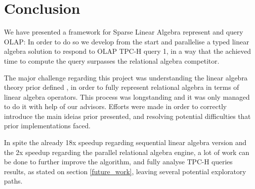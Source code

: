 \section{Conclusion}
\indent
\label{conclusion}


We have presented a framework for Sparse Linear Algebra represent and query OLAP: In order to do so we develop from the start and parallelise a typed linear algebra solution to respond to OLAP TPC-H query 1,  in a way that the achieved time to compute the query surpasses the relational algebra competitor.\par 

The major challenge regarding this project was understanding the linear algebra theory prior defined\cite{macedo2015linear} \cite{da2015benchmarking}, in order to fully represent relational algebra in terms of linear algebra operators. This process was longstanding and it was only managed to do it with help of our advisors. Efforts were made in order to correctly introduce the main ideias prior presented\cite{macedo2015linear}, and resolving potential difficulties that prior implementations faced. \par

In spite the already 18x speedup regarding sequential linear algebra version and the 2x speedup regarding the parallel relational algebra engine, a lot of work can be done to further improve
the algorithm, and fully analyse TPC-H queries results, as stated on section \ref{future_work}, leaving several potential exploratory paths.

 




